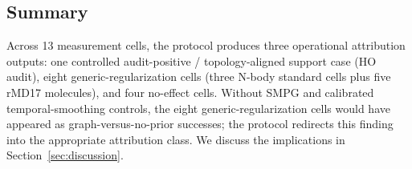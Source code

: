 \documentclass[preprint,12pt]{elsarticle}
\begin{document}
\subsection{Summary}
\label{sec:results-summary}

Across 13 measurement cells, the protocol produces three operational 
attribution outputs: one controlled audit-positive / 
topology-aligned support case (HO audit), eight 
generic-regularization cells (three N-body standard cells plus five 
rMD17 molecules), and four no-effect cells. Without SMPG and 
calibrated temporal-smoothing controls, the eight 
generic-regularization cells would have appeared as 
graph-versus-no-prior successes; the protocol redirects this finding 
into the appropriate attribution class. We discuss the implications 
in Section~\ref{sec:discussion}.
\end{document}
